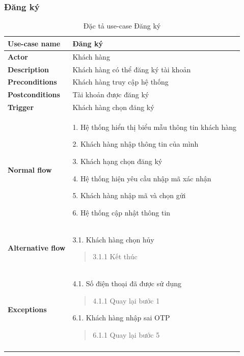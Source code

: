 \subsubsection{Đăng ký}
{
    \setlength\extrarowheight{6pt}
    \begin{longtable}{| p{} | p{} |}
        \hline
        \textbf{Use-case name}
         &
        Đăng ký
        \\
        \hline
        \textbf{Actor}
         &
        Khách hàng
        \\
        \hline
        \textbf{Description}
         &
        Khách hàng có thể đăng ký tài khoản
        \\
        \hline
        \textbf{Preconditions}
         &
        Khách hàng truy cập hệ thống
        \\
        \hline
        \textbf{Postconditions}
         &
        Tài khoản được đăng ký
        \\
        \hline
        \textbf{Trigger}
         &
        Khách hàng chọn đăng ký
        \\
        \hline
        \begin{flushleft}
            \textbf{Normal flow}
        \end{flushleft}
         &
        1. Hệ thống hiển thị biểu mẫu thông tin khách hàng

        2. Khách hàng nhập thông tin của mình

        3. Khách hạng chọn đăng ký

        4. Hệ thống hiện yêu cầu nhập mã xác nhận

        5. Khách hàng nhập mã và chọn gửi

        6. Hệ thống cập nhật thông tin
        \\
        \hline
        \begin{flushleft}
            \textbf{Alternative flow}
        \end{flushleft}
         &
        3.1. Khách hàng chọn hủy
        \begin{quote}
            3.1.1 Kết thúc
        \end{quote}
        \\
        \hline
        \begin{flushleft}
            \textbf{Exceptions}
        \end{flushleft}
         &
        4.1. Số điện thoại đã được sử dụng
        \begin{quote}
            4.1.1 Quay lại bước 1
        \end{quote}
        6.1. Khách hàng nhập sai OTP
        \begin{quote}
            6.1.1 Quay lại bước 5
        \end{quote}
        \\
        \hline
        \caption{Đặc tả use-case Đăng ký}
    \end{longtable}
}

